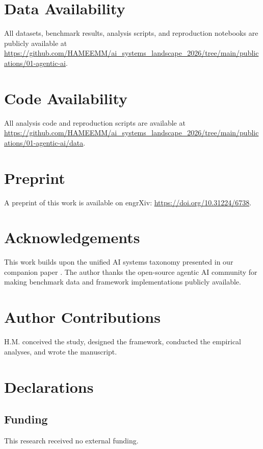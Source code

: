 \documentclass[sn-basic]{sn-jnl}
\theoremstyle{definition}
\begin{document}
\backmatter

\section*{Data Availability}

All datasets, benchmark results, analysis scripts, and reproduction notebooks are publicly available at \url{https://github.com/HAMEEMM/ai_systems_landscape_2026/tree/main/publications/01-agentic-ai}.

\section*{Code Availability}

All analysis code and reproduction scripts are available at \url{https://github.com/HAMEEMM/ai_systems_landscape_2026/tree/main/publications/01-agentic-ai/data}.

\section*{Preprint}

A preprint of this work is available on engrXiv: \url{https://doi.org/10.31224/6738}.

\section*{Acknowledgements}

This work builds upon the unified AI systems taxonomy presented in our companion paper \citep{mahdi2026taxonomy}. The author thanks the open-source agentic AI community for making benchmark data and framework implementations publicly available.

\section*{Author Contributions}

H.M. conceived the study, designed the framework, conducted the empirical analyses, and wrote the manuscript.

\section*{Declarations}

\subsection*{Funding}
This research received no external funding.
\end{document}
